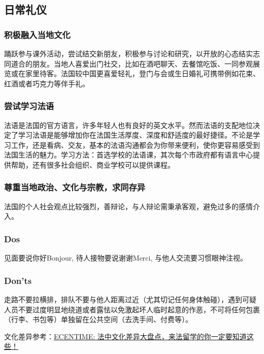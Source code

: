 \subsection{日常礼仪}
\subsubsection{积极融入当地文化}
踊跃参与课外活动，尝试结交新朋友，积极参与讨论和研究，以开放的心态结实志同道合的朋友。当地人喜爱出门社交，比如在酒吧聊天、去餐馆吃饭、一同参观展览或在家里待客。法国较中国更喜爱轻礼，登门与会或生日婚礼可携带例如花束、红酒或者巧克力等伴手礼。

\subsubsection{尝试学习法语}
法语是法国的官方语言，许多年轻人也有良好的英文水平。然而法语的支配地位决定了学习法语是能够增加你在法国生活厚度、深度和舒适度的最好捷径。不论是学习工作，还是看病、交友，基本的法语沟通都会为你带来便利，使你更容易感受到法国生活的魅力。学习方法：首选学校的法语课，其次每个市政府都有语言中心提供帮助，还有很多社会组织、商业学校可以提供课程。

\subsubsection{尊重当地政治、文化与宗教，求同存异}
法国的个人社会观点比较强烈，善辩论，与人辩论需秉承客观，避免过多的感情介入。

\subsubsection{Dos}
见面要说你好Bonjour, 待人接物要说谢谢Merci, 与他人交流要习惯眼神注视。

\subsubsection{Don'ts}
走路不要拉横排，排队不要与他人距离过近（尤其切记任何身体触碰），遇到可疑人员不要过度明显地绕道或者露怯以免激起坏人临时起意的作恶，不可将任何包裹（行李、书包等）单独留在公共空间（去洗手间、付费等）。

文化差异参考：\href{https://www.ecentime.com/article/difference-culturelle}{ECENTIME: 法中文化差异大盘点，来法留学的你一定要知道这些！}
